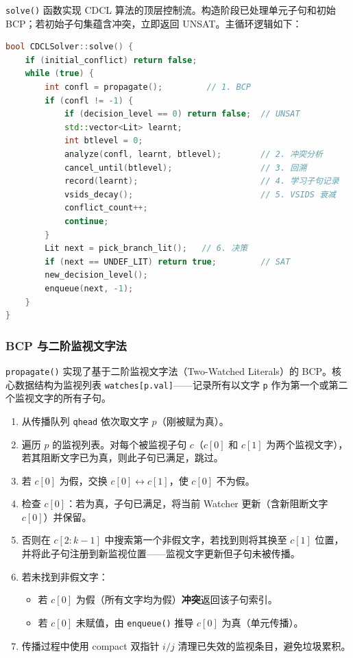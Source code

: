 \documentclass[12pt,a4paper]{article}
\begin{document}
\texttt{solve()} 函数实现 CDCL 算法的顶层控制流。构造阶段已处理单元子句和初始 BCP；若初始子句集蕴含冲突，立即返回 UNSAT。主循环逻辑如下：

\begin{lstlisting}[language=C++, caption=CDCL 主循环]
bool CDCLSolver::solve() {
    if (initial_conflict) return false;
    while (true) {
        int confl = propagate();         // 1. BCP
        if (confl != -1) {
            if (decision_level == 0) return false;  // UNSAT
            std::vector<Lit> learnt;
            int btlevel = 0;
            analyze(confl, learnt, btlevel);        // 2. 冲突分析
            cancel_until(btlevel);                  // 3. 回溯
            record(learnt);                         // 4. 学习子句记录
            vsids_decay();                          // 5. VSIDS 衰减
            conflict_count++;
            continue;
        }
        Lit next = pick_branch_lit();   // 6. 决策
        if (next == UNDEF_LIT) return true;         // SAT
        new_decision_level();
        enqueue(next, -1);
    }
}
\end{lstlisting}

\subsubsection{BCP 与二阶监视文字法}

\texttt{propagate()} 实现了基于二阶监视文字法（Two-Watched Literals）的 BCP。核心数据结构为监视列表 \texttt{watches[p.val]}——记录所有以文字 \texttt{p} 作为第一个或第二个监视文字的所有子句。

\begin{enumerate}[label=(\arabic*)]
    \item 从传播队列 \texttt{qhead} 依次取文字 $p$（刚被赋为真）。
    \item 遍历 $p$ 的监视列表。对每个被监视子句 $c$（$c[0]$ 和 $c[1]$ 为两个监视文字），若其阻断文字已为真，则此子句已满足，跳过。
    \item 若 $c[0]$ 为假，交换 $c[0] \leftrightarrow c[1]$，使 $c[0]$ 不为假。
    \item 检查 $c[0]$：若为真，子句已满足，将当前 Watcher 更新（含新阻断文字 $c[0]$）并保留。
    \item 否则在 $c[2:k-1]$ 中搜索第一个非假文字，若找到则将其换至 $c[1]$ 位置，并将此子句注册到新监视位置——监视文字更新但子句未被传播。
    \item 若未找到非假文字：
    \begin{itemize}
        \item 若 $c[0]$ 为假（所有文字均为假）\textbf{冲突}返回该子句索引。
        \item 若 $c[0]$ 未赋值，由 \texttt{enqueue()} 推导 $c[0]$ 为真（单元传播）。
    \end{itemize}
    \item 传播过程中使用 compact 双指针 $i/j$ 清理已失效的监视条目，避免垃圾累积。
\end{enumerate}
\end{document}
